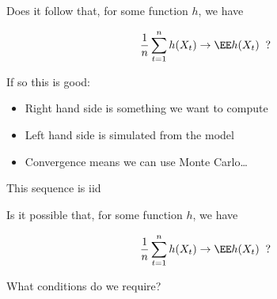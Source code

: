 \begin{frame}

    Does it follow that, for some function $h$, we have

    \begin{equation}
        \frac{1}{n} \sum_{t=1}^n h(X_t) \to \EE h(X_t)
        \;\; ?
    \end{equation}

        \vspace{0.5em}
    If so this is good:

    \begin{itemize}
        \item Right hand side is something we want to compute
        \vspace{0.5em}
        \item Left hand side is simulated from the model
        \vspace{0.5em}
        \item Convergence means we can use Monte Carlo\ldots
    \end{itemize}

\end{frame}


\begin{frame}

    This sequence is  {\sc iid}


    \begin{figure}
       \begin{center}
       \end{center}
    \end{figure}


\end{frame}



\begin{frame}

    Is it possible that, for some function $h$, we have

    \begin{equation}
        \frac{1}{n} \sum_{t=1}^n h(X_t) \to \EE h(X_t)
        \;\; ?
    \end{equation}


    \vspace{2em}

    What conditions do we require?

\end{frame}


